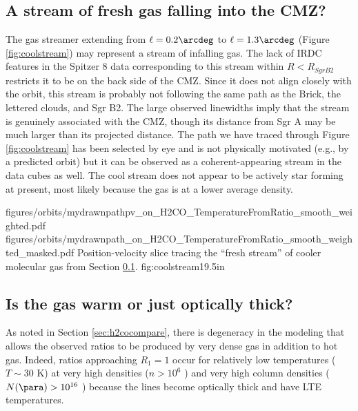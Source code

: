 

\subsection{A stream of fresh gas falling into the CMZ?}
\label{sec:coolstream}
The gas streamer extending from $\ell=0.2\arcdeg$ to $\ell=1.3\arcdeg$ (Figure
\ref{fig:coolstream}) may represent a stream of infalling gas.  The lack of
IRDC features in the Spitzer 8 \um data corresponding to this stream within
$R<R_{SgrB2}$ restricts it to
be on the back side of the CMZ.  Since it does not align closely with the
\citet{Kruijssen2014d} orbit, this stream is probably not
following the same path as the Brick, the lettered clouds, and Sgr B2.
The large observed linewidths imply that the stream is genuinely associated
with the CMZ, though its distance from Sgr A may be much larger than its
projected distance.  The path we have traced through Figure \ref{fig:coolstream}
has been selected by eye and is not physically motivated (e.g., by a predicted orbit)
but it can be observed as a coherent-appearing stream in the \thirteenco data cubes
as well.
The cool stream does
not appear to be actively star forming at present, most likely because the gas
is at a lower average density.


\RotFigureTwoAA
{figures/orbits/mydrawnpathpv_on_H2CO_TemperatureFromRatio_smooth_weighted.pdf}
{figures/orbits/mydrawnpath_on_H2CO_TemperatureFromRatio_smooth_weighted_masked.pdf}
{Position-velocity slice tracing the ``fresh stream'' of cooler molecular
gas from Section \ref{sec:coolstream}.}
{fig:coolstream}{1}{9.5in}

\subsection{Is the gas warm or just optically thick?}
\label{sec:thickorwarm}
As noted in Section \ref{sec:h2cocompare}, there is degeneracy in the modeling
that allows the observed ratios to be produced by very dense gas in addition to
hot gas.  Indeed, ratios approaching $R_1=1$ occur for relatively low
temperatures ($T\sim30$ K) at very high densities ($n>10^{6}$ \percc)
and very high column densities ($N(\para)>10^{16}$ \perkms \persc) because
the lines become optically thick and have LTE temperatures.

